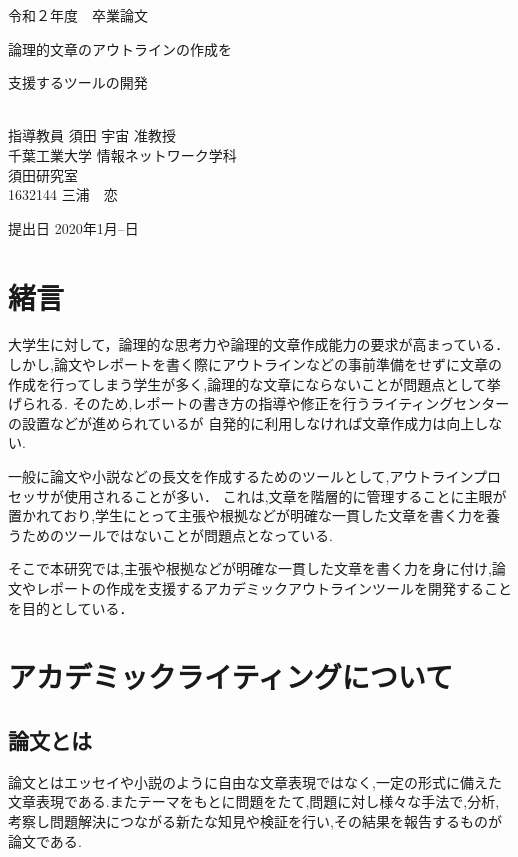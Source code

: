 \documentclass[a4j,12pt]{jarticle}
\begin{document}
\begin{center}
\thispagestyle{empty}
\vspace*{5zh}
\huge
令和２年度　卒業論文\\[50pt]
{\Huge 論理的文章のアウトラインの作成を

支援するツールの開発}\\
[80pt]
\huge
指導教員 須田 宇宙 准教授\\[30pt]
千葉工業大学 情報ネットワーク学科\\[10pt]
須田研究室\\[60pt]
1632144 \hspace{70pt} 三浦　恋\\[75pt]
\end{center}
\vspace*{-2cm}
\begin{flushright} 
\huge
提出日 2020年1月--日
\end{flushright}

\newpage
{}
\tableofcontents%
\newpage
{}
\section{緒言}

大学生に対して，論理的な思考力や論理的文章作成能力の要求が高まっている．
しかし,論文やレポートを書く際にアウトラインなどの事前準備をせずに文章の作成を行ってしまう学生が多く,論理的な文章にならないことが問題点として挙げられる.
そのため,レポートの書き方の指導や修正を行うライティングセンターの設置などが進められているが
自発的に利用しなければ文章作成力は向上しない.

一般に論文や小説などの長文を作成するためのツールとして,アウトラインプロセッサが使用されることが多い．
これは,文章を階層的に管理することに主眼が置かれており,学生にとって主張や根拠などが明確な一貫した文章を書く力を養うためのツールではないことが問題点となっている.

そこで本研究では,主張や根拠などが明確な一貫した文章を書く力を身に付け,論文やレポートの作成を支援するアカデミックアウトラインツールを開発することを目的としている．
\newpage
\section{アカデミックライティングについて}
\subsection{論文とは}
論文とはエッセイや小説のように自由な文章表現ではなく,一定の形式に備えた文章表現である.またテーマをもとに問題をたて,問題に対し様々な手法で,分析,考察し問題解決につながる新たな知見や検証を行い,その結果を報告するものが論文である\cite{ren1}.
\end{document}
